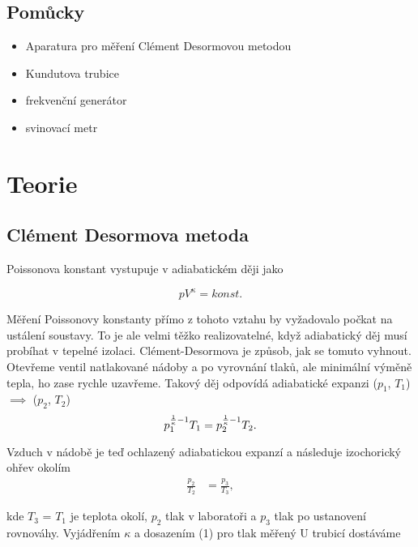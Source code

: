 \documentclass[a4paper,11pt]{article}
\begin{document}
\subsection{Pomůcky}

\begin{itemize}
  \item Aparatura pro měření Clément Desormovou metodou
  \item Kundutova trubice
  \item frekvenční generátor
  \item svinovací metr
\end{itemize}
 
\section{Teorie}

\subsection{Clément Desormova metoda}

Poissonova konstant vystupuje v adiabatickém ději jako

\begin{equation}
  pV^{\kappa} = konst.
\end{equation}

\noindent
Měření Poissonovy konstanty přímo z tohoto vztahu by vyžadovalo počkat na ustálení soustavy. To je ale velmi těžko realizovatelné, když adiabatický děj musí probíhat v tepelné izolaci. Clément-Desormova je způsob, jak se tomuto vyhnout. 
Otevřeme ventil natlakované nádoby a po vyrovnání tlaků, ale minimální výměně tepla, ho zase rychle uzavřeme. Takový děj odpovídá adiabatické expanzi ($p_1$, $T_1$) $\implies$ ($p_2$, $T_2$) \\

\begin{equation}
  p_1^{\frac{1}{\kappa} -1} T_1 = p_2^{\frac{1}{\kappa} -1} T_2. \\
\end{equation}

\noindent
Vzduch v nádobě je teď ochlazený adiabatickou expanzí a následuje izochorický ohřev okolím \\ 

\begin{align}
  \frac{p_2}{T_2} &= \frac{p_3}{T_3},
\end{align}

\noindent
kde $T_3$ = $T_1$ je teplota okolí, $p_2$ tlak v laboratoři a $p_3$ tlak po ustanovení rovnováhy. 
Vyjádřením $\kappa$ a dosazením (1) pro tlak měřený U trubicí dostáváme
\end{document}
